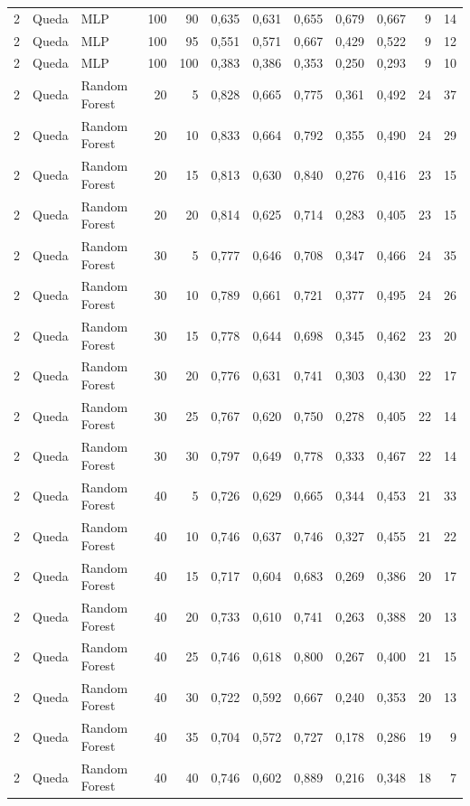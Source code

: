 \begin{longtable}{@{}rllrrrrrrrrr@{}}
2 & Queda & MLP & 100 & 90 & 0,635 & 0,631 & 0,655 & 0,679 & 0,667 & 9 & 14 \\
2 & Queda & MLP & 100 & 95 & 0,551 & 0,571 & 0,667 & 0,429 & 0,522 & 9 & 12 \\
2 & Queda & MLP & 100 & 100 & 0,383 & 0,386 & 0,353 & 0,250 & 0,293 & 9 & 10 \\
2 & Queda & Random Forest & 20 & 5 & 0,828 & 0,665 & 0,775 & 0,361 & 0,492 & 24 & 37 \\
2 & Queda & Random Forest & 20 & 10 & 0,833 & 0,664 & 0,792 & 0,355 & 0,490 & 24 & 29 \\
2 & Queda & Random Forest & 20 & 15 & 0,813 & 0,630 & 0,840 & 0,276 & 0,416 & 23 & 15 \\
2 & Queda & Random Forest & 20 & 20 & 0,814 & 0,625 & 0,714 & 0,283 & 0,405 & 23 & 15 \\
2 & Queda & Random Forest & 30 & 5 & 0,777 & 0,646 & 0,708 & 0,347 & 0,466 & 24 & 35 \\
2 & Queda & Random Forest & 30 & 10 & 0,789 & 0,661 & 0,721 & 0,377 & 0,495 & 24 & 26 \\
2 & Queda & Random Forest & 30 & 15 & 0,778 & 0,644 & 0,698 & 0,345 & 0,462 & 23 & 20 \\
2 & Queda & Random Forest & 30 & 20 & 0,776 & 0,631 & 0,741 & 0,303 & 0,430 & 22 & 17 \\
2 & Queda & Random Forest & 30 & 25 & 0,767 & 0,620 & 0,750 & 0,278 & 0,405 & 22 & 14 \\
2 & Queda & Random Forest & 30 & 30 & 0,797 & 0,649 & 0,778 & 0,333 & 0,467 & 22 & 14 \\
2 & Queda & Random Forest & 40 & 5 & 0,726 & 0,629 & 0,665 & 0,344 & 0,453 & 21 & 33 \\
2 & Queda & Random Forest & 40 & 10 & 0,746 & 0,637 & 0,746 & 0,327 & 0,455 & 21 & 22 \\
2 & Queda & Random Forest & 40 & 15 & 0,717 & 0,604 & 0,683 & 0,269 & 0,386 & 20 & 17 \\
2 & Queda & Random Forest & 40 & 20 & 0,733 & 0,610 & 0,741 & 0,263 & 0,388 & 20 & 13 \\
2 & Queda & Random Forest & 40 & 25 & 0,746 & 0,618 & 0,800 & 0,267 & 0,400 & 21 & 15 \\
2 & Queda & Random Forest & 40 & 30 & 0,722 & 0,592 & 0,667 & 0,240 & 0,353 & 20 & 13 \\
2 & Queda & Random Forest & 40 & 35 & 0,704 & 0,572 & 0,727 & 0,178 & 0,286 & 19 & 9 \\
2 & Queda & Random Forest & 40 & 40 & 0,746 & 0,602 & 0,889 & 0,216 & 0,348 & 18 & 7 \\

\end{longtable}
